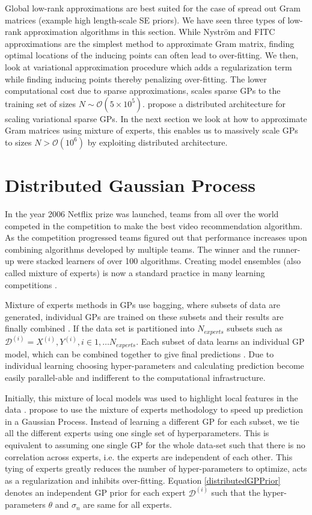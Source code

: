 Global low-rank approximations are best suited for the case of spread out Gram matrices (example high length-scale SE priors). We have seen three types of low-rank approximation algorithms in this section. While Nystr\"{o}m and FITC approximations are the simplest method to approximate Gram matrix, finding optimal locations of the inducing points can often lead to over-fitting. We then, look at variational approximation procedure which adds a regularization term while finding inducing points thereby penalizing over-fitting. The lower computational cost due to sparse approximations, scales sparse GPs to the training set of sizes \(N \sim \mathcal{O}(5 \times 10^5)\). \cite{Gal2014Distributed} propose a distributed architecture for scaling variational sparse GPs. In the next section we look at how to approximate Gram matrices using mixture of experts, this enables us to massively scale GPs to sizes \(N > \mathcal{O}(10^6)\) by exploiting distributed architecture.

\section{Distributed Gaussian Process}\label{secDgp}
In the year 2006 Netflix prize was launched, teams from all over the world competed in the competition to make the best video recommendation algorithm. As the competition progressed teams figured out that performance increases upon combining algorithms developed by multiple teams. The winner and the runner-up were stacked learners of over 100 algorithms. Creating model ensembles (also called mixture of experts) is now a standard practice in many learning competitions \cite{bauer1998empirical}. 

Mixture of experts methods in GPs use bagging, where subsets of data are generated, individual GPs are trained on these subsets and their results are finally combined \cite{chen2009bagging}. If the data set is partitioned  into \(N_{experts}\) subsets such as $\mathcal{D}^{(i)} = {X^{(i)}, Y^{(i)}}, i \in 1, \ldots N_{experts}$. Each subset of data learns an individual GP model, which can be combined together to give final predictions . Due to individual learning choosing hyper-parameters and calculating prediction become easily parallel-able and indifferent to the computational infrastructure. 

Initially, this mixture of local models was used to highlight local features in the data \cite{rasmussen2002infinite}. \cite{ng2014hierarchical} propose to use the mixture of experts methodology to speed up prediction in a Gaussian Process. Instead of learning a different GP for each subset, we tie all the different experts using one single set of hyperparameters. This is equivalent to assuming one single GP for the whole data-set such that there is no correlation across experts, i.e. the experts are independent of each other. This tying of experts greatly reduces the number of hyper-parameters to optimize, acts as a regularization and inhibits over-fitting. Equation \ref{distributedGPPrior} denotes an independent GP prior for each expert \(\mathcal{D}^{(i)}\) such that the hyper-parameters \(\theta\) and \(\sigma_{n}\) are same for all experts.


